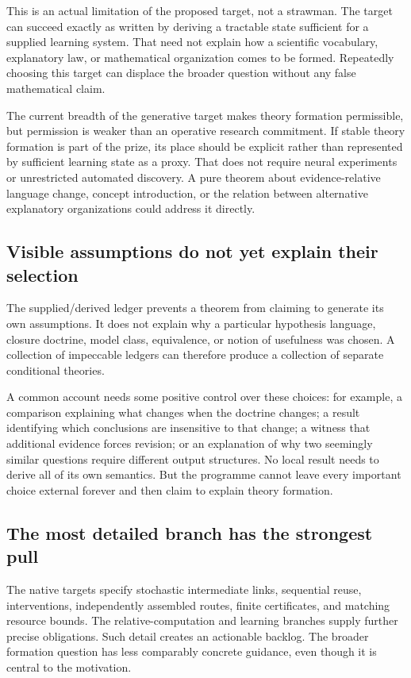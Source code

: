 \documentclass[11pt]{article}
\begin{document}
This is an actual limitation of the proposed target, not a strawman. The target can succeed exactly as written by deriving a tractable state sufficient for a supplied learning system. That need not explain how a scientific vocabulary, explanatory law, or mathematical organization comes to be formed. Repeatedly choosing this target can displace the broader question without any false mathematical claim.

The current breadth of the generative target makes theory formation permissible, but permission is weaker than an operative research commitment. If stable theory formation is part of the prize, its place should be explicit rather than represented by sufficient learning state as a proxy. That does not require neural experiments or unrestricted automated discovery. A pure theorem about evidence-relative language change, concept introduction, or the relation between alternative explanatory organizations could address it directly.

\subsection{Visible assumptions do not yet explain their selection}

The supplied/derived ledger prevents a theorem from claiming to generate its own assumptions. It does not explain why a particular hypothesis language, closure doctrine, model class, equivalence, or notion of usefulness was chosen. A collection of impeccable ledgers can therefore produce a collection of separate conditional theories.

A common account needs some positive control over these choices: for example, a comparison explaining what changes when the doctrine changes; a result identifying which conclusions are insensitive to that change; a witness that additional evidence forces revision; or an explanation of why two seemingly similar questions require different output structures. No local result needs to derive all of its own semantics. But the programme cannot leave every important choice external forever and then claim to explain theory formation.

\subsection{The most detailed branch has the strongest pull}

The native targets specify stochastic intermediate links, sequential reuse, interventions, independently assembled routes, finite certificates, and matching resource bounds. The relative-computation and learning branches supply further precise obligations. Such detail creates an actionable backlog. The broader formation question has less comparably concrete guidance, even though it is central to the motivation.
\end{document}
